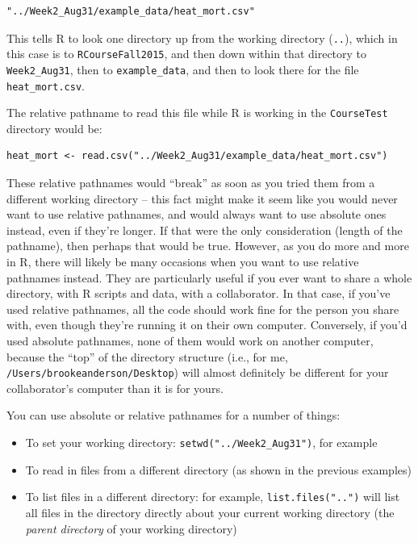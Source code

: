 \documentclass[]{book}
\providecommand{\tightlist}{%
  \setlength{\itemsep}{0pt}\setlength{\parskip}{0pt}}
\theoremstyle{definition}
\theoremstyle{definition}
\theoremstyle{definition}
\theoremstyle{remark}
\begin{document}
\begin{verbatim}
"../Week2_Aug31/example_data/heat_mort.csv"
\end{verbatim}

This tells R to look one directory up from the working directory
(\texttt{..}), which in this case is to \texttt{RCourseFall2015}, and
then down within that directory to \texttt{Week2\_Aug31}, then to
\texttt{example\_data}, and then to look there for the file
\texttt{heat\_mort.csv}.

The relative pathname to read this file while R is working in the
\texttt{CourseTest} directory would be:

\begin{verbatim}
heat_mort <- read.csv("../Week2_Aug31/example_data/heat_mort.csv")
\end{verbatim}

These relative pathnames would ``break'' as soon as you tried them from
a different working directory -- this fact might make it seem like you
would never want to use relative pathnames, and would always want to use
absolute ones instead, even if they're longer. If that were the only
consideration (length of the pathname), then perhaps that would be true.
However, as you do more and more in R, there will likely be many
occasions when you want to use relative pathnames instead. They are
particularly useful if you ever want to share a whole directory, with R
scripts and data, with a collaborator. In that case, if you've used
relative pathnames, all the code should work fine for the person you
share with, even though they're running it on their own computer.
Conversely, if you'd used absolute pathnames, none of them would work on
another computer, because the ``top'' of the directory structure (i.e.,
for me, \texttt{/Users/brookeanderson/Desktop}) will almost definitely
be different for your collaborator's computer than it is for yours.

You can use absolute or relative pathnames for a number of things:

\begin{itemize}
\tightlist
\item
  To set your working directory: \texttt{setwd("../Week2\_Aug31")}, for
  example
\item
  To read in files from a different directory (as shown in the previous
  examples)
\item
  To list files in a different directory: for example,
  \texttt{list.files("..")} will list all files in the directory
  directly about your current working directory (the \emph{parent
  directory} of your working directory)
\end{itemize}
\end{document}
